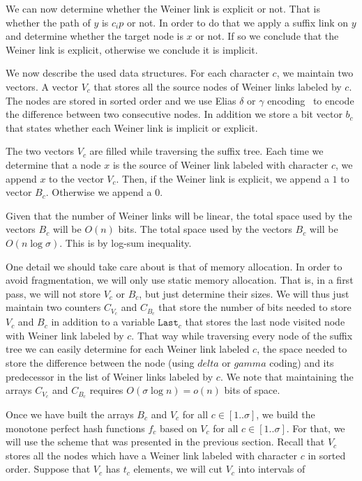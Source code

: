 \documentclass[a4paper]{article}
\begin{document}
We can now determine whether the Weiner link is explicit 
or not. That is whether the path of $y$ is $c_ip$ or not. In order to do that 
we apply a suffix link on $y$ and determine whether the target node is $x$ 
or not. If so we conclude that the Weiner link is explicit, otherwise we 
conclude it is implicit. 

We now describe the used data structures. For each character $c$, we 
maintain two vectors. A vector $V_c$ that stores all the source nodes 
of Weiner links labeled by $c$. The nodes are stored in sorted order and 
we use Elias $\delta$ or $\gamma$ encoding~\cite{El75} to encode the difference between two consecutive 
nodes. In addition we store a bit vector $b_c$ that states whether each Weiner link 
is implicit or explicit. 

The two vectors $V_c$ are filled while traversing the suffix tree. Each time 
we determine that a node $x$ is the source of Weiner link labeled with character 
$c$, we append $x$ to the vector $V_c$. Then, if the Weiner link is explicit, we 
append a $1$ to vector $B_c$. Otherwise we append a $0$. 

Given that the number of Weiner links 
will be linear, the total space used by the vectors 
$B_c$ will be $O(n)$ bits. The total space used by the vectors $B_c$ will 
be $O(n\log\sigma)$. This is by log-sum inequality. 

One detail we should take care about is that of memory allocation. 
In order to avoid fragmentation, 
we will only use static memory allocation. That is, in a first pass, we will not 
store $V_c$ or $B_c$, but just determine their sizes. We will thus just maintain two 
counters $C_{V_c}$ and $C_{B_c}$ that store the number of bits needed to store 
$V_c$ and $B_c$ in addition to a variable $\mathtt{Last}_c$ that stores the last node visited 
node with Weiner link labeled by $c$. That way while traversing every node of the suffix tree
we can easily determine for each Weiner link labeled $c$, the 
space needed to store the difference between the node (using $delta$ or $gamma$ coding)
and its predecessor in the list of Weiner links labeled by $c$. 
We note that maintaining the arrays $C_{V_c}$ and $C_{B_c}$ 
requires $O(\sigma\log n)=o(n)$ bits of space. 

Once we have built the arrays $B_c$ and $V_c$ for all $c\in[1..\sigma]$, 
we build the monotone perfect hash functions $f_c$ based on $V_c$
for all $c\in[1..\sigma]$. 
For that, we will use the scheme that was presented in the previous section. 
Recall that $V_c$ stores all the nodes which have a Weiner link 
labeled with character $c$ in sorted order. Suppose that $V_c$
has $t_c$ elements, we will cut $V_c$ into intervals of 
\end{document}

